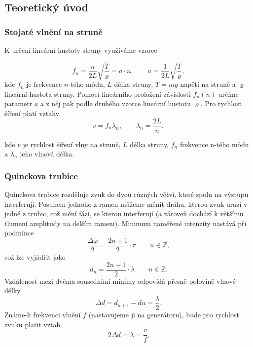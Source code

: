 \documentclass[english]{article}
\begin{document}
\subsection{Teoretický úvod}
	\subsubsection{Stojaté vlnění na struně}
		K určení lineární hustoty struny využíváme vzorce 
		
		\begin{equation}
		f_n = \frac{n}{2L} \sqrt{\frac{T}{\varrho}} = a \cdot n, \qquad a = \frac{1}{2L} \sqrt{\frac{T}{\varrho}},
		\label{eq:struna_uvod}
		\end{equation}		
		kde $f_n$ je frekvence $n$-tého módu, $L$ délka struny, $T=mg$ napětí na struně a $\varrho$ lineární hustota struny. Pomocí lineárního proložení závislosti $f_n(n)$ určíme parametr $a$ a z něj pak podle druhého vzorce lineární hustotu $\varrho$.
		Pro rychlost šíření platí vztahy 
		\begin{equation}
		v = f_n \lambda_n,\qquad \lambda_n = \frac{2L}{n},
		\label{eq:struna_rychlost}
		\end{equation}		
		
		kde $v$ je rychlost šíření vlny na struně, $L$ délka struny, $f_n$ frekvence n-tého módu a $\lambda_n$ jeho vlnová délka.		
		
	\subsubsection{Quinckova trubice}
		Quinckova trubice rozděluje zvuk do dvou různých větví, které spolu na výstupu interferují. Posunem jednoho z ramen můžeme měnit dráhu, kterou zvuk urazí v jedné z trubic, což mění fázi, se kterou interferují (a zároveň dochází k většímu tlumení amplitudy na delším rameni). Minimum naměřené intenzity nastává při podmínce 
		\begin{equation}
		\frac{\Delta \varphi}{2} = \frac{2n+1}{2} \cdot \pi \qquad n \in \mathbb{Z},
		\end{equation}
		což lze vyjádřit jako
		\begin{equation}
		d_n = \frac{2n+1}{2} \cdot \lambda \qquad n \in \mathbb{Z}.
		\end{equation}
		Vzdálenost mezi dvěma sousedními minimy odpovídá přesně polovině vlnové délky
		\begin{equation}
		\Delta d = d_{n+1} - d{n} = \frac{\lambda}{2}.
		\end{equation}
		Známe-li frekvenci vlnění $f$ (nastavujeme ji na generátoru), bude pro rychlost zvuku platit vztah
		\begin{equation}
		2\Delta d = \lambda = \frac{v}{f}.
		\label{eq:quinck}
		\end{equation}
		
\end{document}
